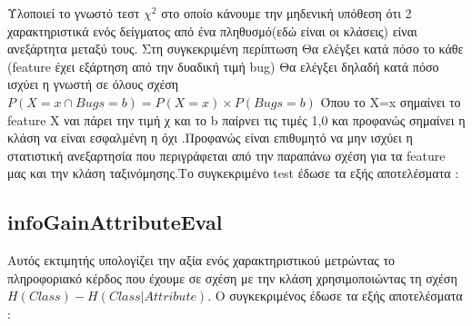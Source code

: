   \newpage
 
 Υλοποιεί το γνωστό τεστ $\chi^2 $ στο οποίο κάνουμε την μηδενική υπόθεση ότι  2 χαρακτηριστικά ενός δείγματος από ένα πληθυσμό(εδώ είναι οι κλάσεις)    είναι ανεξάρτητα μεταξύ τους.
Στη συγκεκριμένη περίπτωση Θα ελέγξει κατά πόσο το κάθε (feature έχει εξάρτηση από την δυαδική τιμή bug)
Θα ελέγξει δηλαδή  κατά πόσο ισχύει η γνωστή σε όλους σχέση $P(X=x \cap Bugs = b) = P(X=x)\times P(Bugs =b)$
Όπου το X=x σημαίνει το feature Χ ναι πάρει την τιμή χ και το b  παίρνει τις τιμές 1,0 και προφανώς σημαίνει η κλάση να είναι εσφαλμένη η όχι .Προφανώς είναι επιθυμητό να μην ισχύει η στατιστική ανεξαρτησία που περιγράφεται από την παραπάνω σχέση για τα feature μας και την κλάση ταξινόμησης.Το συγκεκριμένο test έδωσε τα εξής αποτελέσματα :

\subsection{infoGainAttributeΕval}
Αυτός εκτιμητής υπολογίζει την αξία ενός χαρακτηριστικού μετρώντας το πληροφοριακό κέρδος που έχουμε σε σχέση με την κλάση χρησιμοποιώντας τη σχέση  $H(Class) - H(Class | Attribute)$.
Ο συγκεκριμένος έδωσε τα εξής αποτελέσματα :\\


